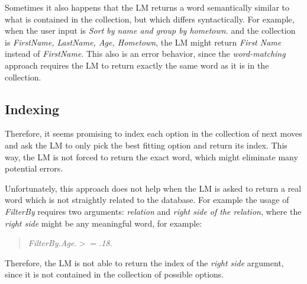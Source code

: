 \documentclass[12pt]{article}
\begin{document}
Sometimes it also happens that the LM returns a word semantically similar to what is contained in the collection, but which differs syntactically. For example, when the user input is \textit{Sort by name and group by hometown.} and the collection is \textit{FirstName, LastName, Age, Hometown}, the LM might return \textit{First Name} instead of \textit{FirstName}. This also is an error behavior, since the \textit{word-matching} approach requires the LM to return exactly the same word as it is in the collection.

\subsection{Indexing}

Therefore, it seems promising to index each option in the collection of next moves and ask the LM to only pick the best fitting option and return its index. This way, the LM is not forced to return the exact word, which might eliminate many potential errors. 

Unfortunately, this approach does not help when the LM is asked to return a real word which is not straightly related to the database. For example the usage of \textit{FilterBy} requires two arguments: \textit{relation} and \textit{right side of the relation}, where the \textit{right side} might be any meaningful word, for example:
\begin{quotation}
    \textit{FilterBy.Age.\begin{math}>=\end{math}.18.}
\end{quotation}
Therefore, the LM is not able to return the index of the \textit{right side} argument, since it is not contained in the collection of possible options.
\end{document}
